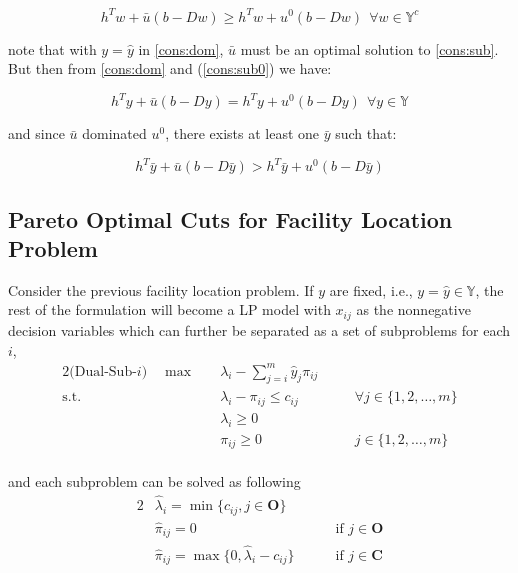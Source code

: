             \begin{equation}
                h^Tw + \bar{u}(b - Dw) \ge h^Tw + u^0(b - Dw)\ \ \forall w \in \mathbb{Y}^c
            \end{equation}

            note that with $y=\hat{y}$ in \ref{cons:dom}, $\bar{u}$ must be an optimal solution to \ref{cons:sub}. But then from \ref{cons:dom} and (\ref{cons:sub0}) we have:

            \begin{equation}
                h^Ty + \bar{u}(b - Dy) = h^Ty + u^0(b - Dy)\ \ \forall y \in \mathbb{Y}
            \end{equation}

            and since $\bar{u}$ dominated $u^0$, there exists at least one $\bar{y}$ such that:

            \begin{equation}
                h^T\bar{y} + \bar{u}(b - D\bar{y}) > h^T\bar{y} + u^0(b - D\bar{y})
            \end{equation}

        \subsection{Pareto Optimal Cuts for Facility Location Problem}
            Consider the previous facility location problem. If $y$ are fixed, i.e., $y = \hat{y} \in \mathbb{Y}$, the rest of the formulation will become a LP model with $x_{ij}$ as the nonnegative decision variables which can further be separated as a set of subproblems for each $i$, 
            \begin{alignat*}{2}
                \text{(Dual-Sub-$i$)} \quad \max \quad & \lambda_i - \sum_{j = i}^m \hat{y}_j \pi_{ij}\\
                \text{s.t.} \quad & \lambda_i - \pi_{ij} \le c_{ij}                  && \quad \forall j \in \{1, 2, \ldots, m\}\\
                                  & \lambda_i \ge 0                                  && \\
                                  & \pi_{ij} \ge 0                                   && \quad j \in \{1, 2, \ldots, m\}\\
            \end{alignat*}

            and each subproblem can be solved as following
            \begin{alignat*}{2}
                &\hat{\lambda}_i = \min \{c_{ij}, j \in \mathbf{O}\} \\
                &\hat{\pi}_{ij} = 0 &&\quad \text{ if } j \in \mathbf{O} \\
                &\hat{\pi}_{ij} = \max\{0, \hat{\lambda}_i - c_{ij}\} &&\quad \text{ if } j \in \mathbf{C} \\
            \end{alignat*}

